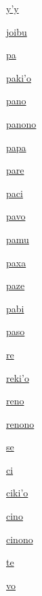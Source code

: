 \dictchar{\#} {}
{\hyperlink{val:yhy}{y'y}}{}{}{}

\dictentry{\&}{}{}{}
{\hyperlink{val:joibu}{joibu}}{}{}{}

{\hyperlink{val:pa}{pa}}{}{}{}

{\hyperlink{val:pakiho}{paki'o}}{}{}{}

{\hyperlink{val:pano}{pano}}{}{}{}

{\hyperlink{val:panono}{panono}}{}{}{}

{\hyperlink{val:papa}{papa}}{}{}{}

{\hyperlink{val:pare}{pare}}{}{}{}

{\hyperlink{val:paci}{paci}}{}{}{}

{\hyperlink{val:pavo}{pavo}}{}{}{}

{\hyperlink{val:pamu}{pamu}}{}{}{}

{\hyperlink{val:paxa}{paxa}}{}{}{}

{\hyperlink{val:paze}{paze}}{}{}{}

{\hyperlink{val:pabi}{pabi}}{}{}{}

{\hyperlink{val:paso}{paso}}{}{}{}

{\hyperlink{val:re}{re}}{}{}{}

{\hyperlink{val:rekiho}{reki'o}}{}{}{}

{\hyperlink{val:reno}{reno}}{}{}{}

{\hyperlink{val:renono}{renono}}{}{}{}

{\hyperlink{val:se}{se}}{}{}{}

{\hyperlink{val:ci}{ci}}{}{}{}

{\hyperlink{val:cikiho}{ciki'o}}{}{}{}

{\hyperlink{val:cino}{cino}}{}{}{}

{\hyperlink{val:cinono}{cinono}}{}{}{}

{\hyperlink{val:te}{te}}{}{}{}

{\hyperlink{val:vo}{vo}}{}{}{}

